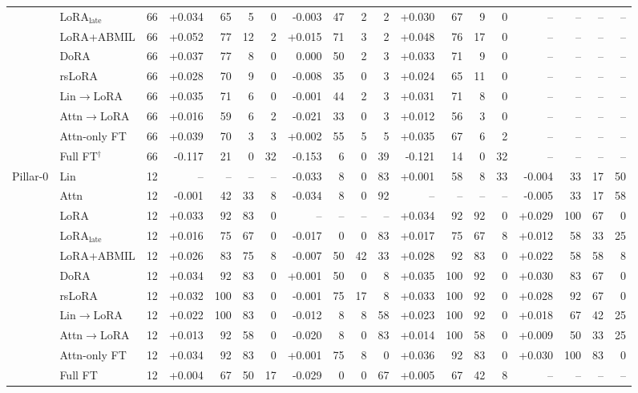 \begin{tabular}{@{}llrrrrrrrrrrrrrrrrr@{}}
 & LoRA$_{\text{late}}$ & 66 & +0.034 & 65 & 5 & 0 & -0.003 & 47 & 2 & 2 & +0.030 & 67 & 9 & 0 & -- & -- & -- & -- \\
 & LoRA+ABMIL & 66 & +0.052 & 77 & 12 & 2 & +0.015 & 71 & 3 & 2 & +0.048 & 76 & 17 & 0 & -- & -- & -- & -- \\
 & DoRA & 66 & +0.037 & 77 & 8 & 0 & 0.000 & 50 & 2 & 3 & +0.033 & 71 & 9 & 0 & -- & -- & -- & -- \\
 & rsLoRA & 66 & +0.028 & 70 & 9 & 0 & -0.008 & 35 & 0 & 3 & +0.024 & 65 & 11 & 0 & -- & -- & -- & -- \\
 & Lin$\to$LoRA & 66 & +0.035 & 71 & 6 & 0 & -0.001 & 44 & 2 & 3 & +0.031 & 71 & 8 & 0 & -- & -- & -- & -- \\
 & Attn$\to$LoRA & 66 & +0.016 & 59 & 6 & 2 & -0.021 & 33 & 0 & 3 & +0.012 & 56 & 3 & 0 & -- & -- & -- & -- \\
 & Attn-only FT & 66 & +0.039 & 70 & 3 & 3 & +0.002 & 55 & 5 & 5 & +0.035 & 67 & 6 & 2 & -- & -- & -- & -- \\
 & Full FT$^{\dagger}$ & 66 & -0.117 & 21 & 0 & 32 & -0.153 & 6 & 0 & 39 & -0.121 & 14 & 0 & 32 & -- & -- & -- & -- \\
\addlinespace
Pillar-0 & Lin & 12 & -- & -- & -- & -- & -0.033 & 8 & 0 & 83 & +0.001 & 58 & 8 & 33 & -0.004 & 33 & 17 & 50 \\
 & Attn & 12 & -0.001 & 42 & 33 & 8 & -0.034 & 8 & 0 & 92 & -- & -- & -- & -- & -0.005 & 33 & 17 & 58 \\
 & LoRA & 12 & +0.033 & 92 & 83 & 0 & -- & -- & -- & -- & +0.034 & 92 & 92 & 0 & +0.029 & 100 & 67 & 0 \\
 & LoRA$_{\text{late}}$ & 12 & +0.016 & 75 & 67 & 0 & -0.017 & 0 & 0 & 83 & +0.017 & 75 & 67 & 8 & +0.012 & 58 & 33 & 25 \\
 & LoRA+ABMIL & 12 & +0.026 & 83 & 75 & 8 & -0.007 & 50 & 42 & 33 & +0.028 & 92 & 83 & 0 & +0.022 & 58 & 58 & 8 \\
 & DoRA & 12 & +0.034 & 92 & 83 & 0 & +0.001 & 50 & 0 & 8 & +0.035 & 100 & 92 & 0 & +0.030 & 83 & 67 & 0 \\
 & rsLoRA & 12 & +0.032 & 100 & 83 & 0 & -0.001 & 75 & 17 & 8 & +0.033 & 100 & 92 & 0 & +0.028 & 92 & 67 & 0 \\
 & Lin$\to$LoRA & 12 & +0.022 & 100 & 83 & 0 & -0.012 & 8 & 8 & 58 & +0.023 & 100 & 92 & 0 & +0.018 & 67 & 42 & 25 \\
 & Attn$\to$LoRA & 12 & +0.013 & 92 & 58 & 0 & -0.020 & 8 & 0 & 83 & +0.014 & 100 & 58 & 0 & +0.009 & 50 & 33 & 25 \\
 & Attn-only FT & 12 & +0.034 & 92 & 83 & 0 & +0.001 & 75 & 8 & 0 & +0.036 & 92 & 83 & 0 & +0.030 & 100 & 83 & 0 \\
 & Full FT & 12 & +0.004 & 67 & 50 & 17 & -0.029 & 0 & 0 & 67 & +0.005 & 67 & 42 & 8 & -- & -- & -- & -- \\
\bottomrule
\end{tabular}
